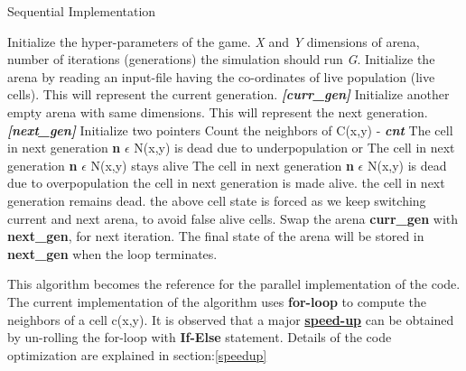 \documentclass[a4paper, 10pt, conference]{IEEEtran}      %
\begin{document}
	\begin{algorithm}
		\caption{Sequential Implementation}
		\label{sequential}
		\begin{algorithmic}[1]
			\State Initialize the hyper-parameters of the game. \textit{X} and \textit{Y} dimensions of arena, number of iterations (generations) the simulation should run \textit{G}.
			\State Initialize the arena by reading an input-file having the co-ordinates of live population (live cells). This will represent the current generation. \textbf{\textit{[curr\_gen]}}
			\State Initialize another empty arena with same dimensions. This will represent the next generation.
			\textbf{\textit{[next\_gen]}}
			\State Initialize two pointers 
					\State Count the neighbors of C(x,y) - \textbf{\textit{cnt}}
							\State The cell in next generation \textbf{n} $\epsilon$ N(x,y) is
							\State dead due to underpopulation or
						\State The cell in next generation \textbf{n} $\epsilon$ N(x,y)
						\State stays alive
						\State The cell in next generation \textbf{n} $\epsilon$ N(x,y) is
						\State dead due to overpopulation
						\EndIf
							\State the cell in next generation is made alive.
						\Else
							\State the cell in next generation remains dead.
							\State the above cell state is forced as we keep 
							\State switching current and next arena, to avoid
							\State false alive cells.
						\EndIf					
					\EndIf
					\State Swap the arena \textbf{curr\_gen} with \textbf{next\_gen}, for next \State iteration.
				\EndFor
			\EndFor
			\State The final state of the arena will be stored in \textbf{next\_gen} when the loop terminates.
		\end{algorithmic}
	\end{algorithm}
	
	This algorithm becomes the reference for the parallel implementation of the code. The current implementation of the algorithm uses \textbf{for-loop} to compute the neighbors of a cell c(x,y). It is observed that a major \underline{\textbf{speed-up}} can be obtained by un-rolling the for-loop with \textbf{If-Else} statement. Details of the code optimization are explained in section:\ref{speedup} \\\\
		
\end{document}
